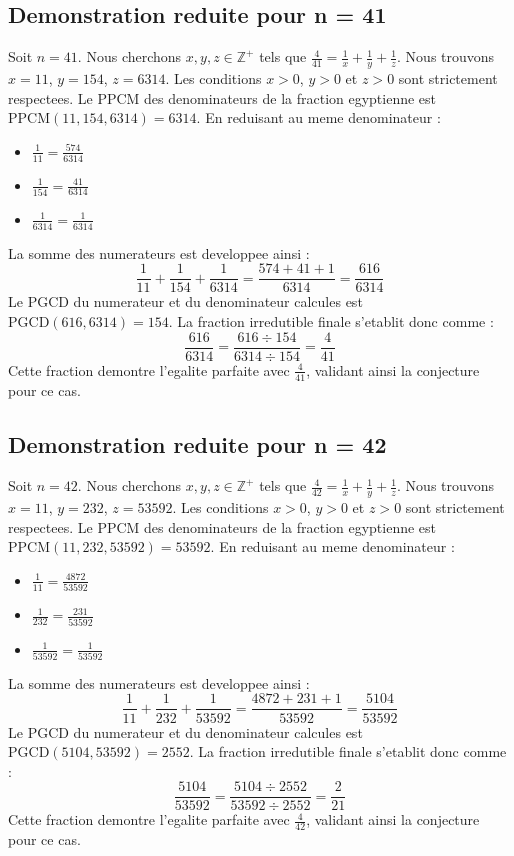 \documentclass[11pt,a4paper]{article}
\begin{document}
\subsection{Demonstration reduite pour n = 41}
Soit $n = 41$. Nous cherchons $x, y, z \in \mathbb{Z}^{+}$ tels que $\frac{4}{41} = \frac{1}{x} + \frac{1}{y} + \frac{1}{z}$.
Nous trouvons $x = 11$, $y = 154$, $z = 6314$.
Les conditions $x > 0$, $y > 0$ et $z > 0$ sont strictement respectees.
Le PPCM des denominateurs de la fraction egyptienne est $\text{PPCM}(11, 154, 6314) = 6314$.
En reduisant au meme denominateur :
\begin{itemize}
    \item $\frac{1}{11} = \frac{574}{6314}$
    \item $\frac{1}{154} = \frac{41}{6314}$
    \item $\frac{1}{6314} = \frac{1}{6314}$
\end{itemize}
La somme des numerateurs est developpee ainsi :
$$ \frac{1}{11} + \frac{1}{154} + \frac{1}{6314} = \frac{574 + 41 + 1}{6314} = \frac{616}{6314} $$
Le PGCD du numerateur et du denominateur calcules est $\text{PGCD}(616, 6314) = 154$.
La fraction irredutible finale s'etablit donc comme :
$$ \frac{616}{6314} = \frac{616 \div 154}{6314 \div 154} = \frac{4}{41} $$
Cette fraction demontre l'egalite parfaite avec $\frac{4}{41}$, validant ainsi la conjecture pour ce cas.

\subsection{Demonstration reduite pour n = 42}
Soit $n = 42$. Nous cherchons $x, y, z \in \mathbb{Z}^{+}$ tels que $\frac{4}{42} = \frac{1}{x} + \frac{1}{y} + \frac{1}{z}$.
Nous trouvons $x = 11$, $y = 232$, $z = 53592$.
Les conditions $x > 0$, $y > 0$ et $z > 0$ sont strictement respectees.
Le PPCM des denominateurs de la fraction egyptienne est $\text{PPCM}(11, 232, 53592) = 53592$.
En reduisant au meme denominateur :
\begin{itemize}
    \item $\frac{1}{11} = \frac{4872}{53592}$
    \item $\frac{1}{232} = \frac{231}{53592}$
    \item $\frac{1}{53592} = \frac{1}{53592}$
\end{itemize}
La somme des numerateurs est developpee ainsi :
$$ \frac{1}{11} + \frac{1}{232} + \frac{1}{53592} = \frac{4872 + 231 + 1}{53592} = \frac{5104}{53592} $$
Le PGCD du numerateur et du denominateur calcules est $\text{PGCD}(5104, 53592) = 2552$.
La fraction irredutible finale s'etablit donc comme :
$$ \frac{5104}{53592} = \frac{5104 \div 2552}{53592 \div 2552} = \frac{2}{21} $$
Cette fraction demontre l'egalite parfaite avec $\frac{4}{42}$, validant ainsi la conjecture pour ce cas.
\end{document}
